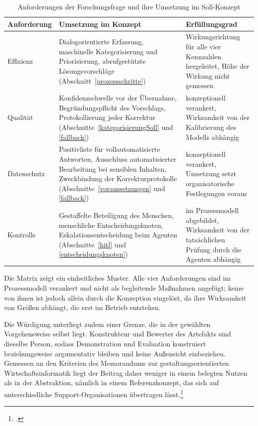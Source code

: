 \begin{table}[!htb]
	\centering
	\caption{Anforderungen der Forschungsfrage und ihre Umsetzung im Soll-Konzept}
	\label{tab:erfuellung}
	\begin{tabularx}{\textwidth}{@{}p{2.1cm}>{\raggedright\arraybackslash}X>{\raggedright\arraybackslash}X@{}}
		\toprule
		Anforderung & Umsetzung im Konzept & Erf\"ullungsgrad \\
		\midrule
		Effizienz & Dialogorientierte Erfassung, maschinelle Kategorisierung und Priorisierung, abrufgest\"utzte L\"osungsvorschl\"age (Abschnitt~\ref{prozessschritte}) & Wirkungsrichtung f\"ur alle vier Kennzahlen hergeleitet, H\"ohe der Wirkung nicht gemessen \\
		Qualit\"at & Konfidenzschwelle vor der \"Ubernahme, Begr\"undungspflicht des Vorschlags, Protokollierung jeder Korrektur (Abschnitte~\ref{kategorisierungSoll} und \ref{fallback}) & konzeptionell verankert, Wirksamkeit von der Kalibrierung des Modells abh\"angig \\
		Datenschutz & Positivliste f\"ur vollautomatisierte Antworten, Ausschluss automatisierter Bearbeitung bei sensiblen Inhalten, Zweckbindung der Korrekturprotokolle (Abschnitte~\ref{voraussetzungen} und \ref{fallback}) & konzeptionell verankert, Umsetzung setzt organisatorische Festlegungen voraus \\
		Kontrolle & Gestaffelte Beteiligung des Menschen, menschliche Entscheidungsknoten, Eskalationsentscheidung beim Agenten (Abschnitte~\ref{hitl} und \ref{entscheidungsknoten}) & im Prozessmodell abgebildet, Wirksamkeit von der tats\"achlichen Pr\"ufung durch die Agenten abh\"angig \\
		\bottomrule
	\end{tabularx}
\end{table}

Die Matrix zeigt ein einheitliches Muster. Alle vier Anforderungen sind im Prozessmodell verankert und nicht als begleitende Ma{\ss}nahmen angef\"ugt; keine von ihnen ist jedoch allein durch die Konzeption eingel\"ost, da ihre Wirksamkeit von Gr\"o{\ss}en abh\"angt, die erst im Betrieb entstehen.

Die W\"urdigung unterliegt zudem einer Grenze, die in der gew\"ahlten Vorgehensweise selbst liegt. Konstrukteur und Bewerter des Artefakts sind dieselbe Person, sodass Demonstration und Evaluation konstruiert beziehungsweise argumentativ bleiben und keine Au{\ss}ensicht einbeziehen. Gemessen an den Kriterien des Memorandums zur gestaltungsorientierten Wirtschaftsinformatik liegt der Beitrag daher weniger in einem belegten Nutzen als in der Abstraktion, n\"amlich in einem Referenzkonzept, das sich auf unterschiedliche Support-Organisationen \"ubertragen l\"asst.\footcite[Vgl.][S.~668\,f.]{Oesterle2010}

